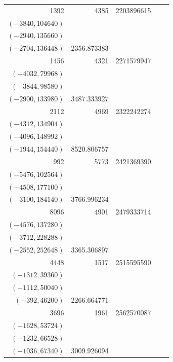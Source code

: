 \documentclass[11pt]{article}
\begin{document}
\begin{longtable}{r r r l r}
1392 & 4385 & 2203896615 & \begin{tabular}[t]{@{}l@{}}$(-4332,36252)$\\$(-3840,104640)$\\$(-2940,135660)$\\$(-2704,136448)$\end{tabular} & 2356.873383\\[5pt]
1456 & 4321 & 2271579947 & \begin{tabular}[t]{@{}l@{}}$(-4212,51012)$\\$(-4032,79968)$\\$(-3844,98580)$\\$(-2900,133980)$\end{tabular} & 3487.333927\\[5pt]
2112 & 4969 & 2322242274 & \begin{tabular}[t]{@{}l@{}}$(-4800,74880)$\\$(-4312,134904)$\\$(-4096,148992)$\\$(-1944,154440)$\end{tabular} & 8520.806757\\[5pt]
992 & 5773 & 2421369390 & \begin{tabular}[t]{@{}l@{}}$(-5704,51336)$\\$(-5476,102564)$\\$(-4508,177100)$\\$(-3100,184140)$\end{tabular} & 3766.996234\\[5pt]
8096 & 4901 & 2479333714 & \begin{tabular}[t]{@{}l@{}}$(-4900,7980)$\\$(-4576,137280)$\\$(-3712,228288)$\\$(-2552,252648)$\end{tabular} & 3365.306897\\[5pt]
4448 & 1517 & 2515595590 & \begin{tabular}[t]{@{}l@{}}$(-1332,37740)$\\$(-1312,39360)$\\$(-1112,50040)$\\$(-392,46200)$\end{tabular} & 2266.664771\\[5pt]
3696 & 1961 & 2562570087 & \begin{tabular}[t]{@{}l@{}}$(-1792,40768)$\\$(-1628,53724)$\\$(-1232,66528)$\\$(-1036,67340)$\end{tabular} & 3009.926094\\[5pt]

\end{longtable}
\end{document}
